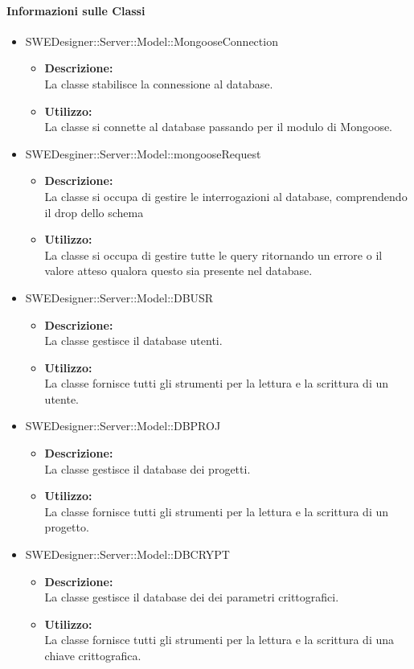 		\paragraph{Informazioni sulle Classi}
		\begin{itemize}
			\item SWEDesigner::Server::Model::MongooseConnection
			\begin{itemize}
				\item \textbf{Descrizione: }\\
				La classe stabilisce la connessione al database.
				\item \textbf{Utilizzo: }\\
				La classe si connette al database passando per il modulo di Mongoose.
			\end{itemize}
			\item SWEDesginer::Server::Model::mongooseRequest
			\begin{itemize}
				\item \textbf{Descrizione: }\\
				La classe si occupa di gestire le interrogazioni al database, comprendendo il drop dello schema
				\item \textbf{Utilizzo: }\\
				La classe si occupa di gestire tutte le query ritornando un errore o il valore atteso qualora questo sia presente nel database.
			\end{itemize}
			\item SWEDesigner::Server::Model::DBUSR
			\begin{itemize}
				\item \textbf{Descrizione: }\\
				La classe gestisce il database utenti.
				\item \textbf{Utilizzo: }\\
				La classe fornisce tutti gli strumenti per la lettura e la scrittura di un utente.
			\end{itemize}
			\item SWEDesigner::Server::Model::DBPROJ
			\begin{itemize}
				\item \textbf{Descrizione: }\\
				La classe gestisce il database dei progetti.
				\item \textbf{Utilizzo: }\\
				La classe fornisce tutti gli strumenti per la lettura e la scrittura di un progetto.
			\end{itemize}
			\item SWEDesigner::Server::Model::DBCRYPT
			\begin{itemize}
				\item \textbf{Descrizione: }\\
				La classe gestisce il database dei dei parametri crittografici.
				\item \textbf{Utilizzo: }\\
				La classe fornisce tutti gli strumenti per la lettura e la scrittura di una chiave crittografica.
			\end{itemize}
		\end{itemize}
